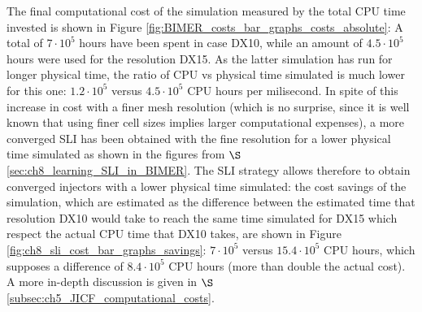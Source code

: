The final computational cost of the simulation measured by the total CPU time invested is shown in Figure \ref{fig:BIMER_costs_bar_graphs_costs_absolute}: A total of $7 \cdot 10^5$ hours have been spent in case DX10, while an amount of $4.5 \cdot 10^5$ hours were used for the resolution DX15. As the latter simulation has run for longer physical time, the ratio of CPU vs physical time simulated is much lower for this one: $1.2 \cdot 10^5$ versus $4.5 \cdot 10^5$ CPU hours per milisecond. In spite of this increase in cost with a finer mesh resolution (which is no surprise, since it is well known that using finer cell sizes implies larger computational expenses), a more converged SLI has been obtained with the fine resolution for a lower physical time simulated as shown in the figures from $\S$\ref{sec:ch8_learning_SLI_in_BIMER}. The SLI strategy allows therefore to obtain converged injectors with a lower physical time simulated: the cost savings of the simulation, which are estimated as the difference between the estimated time that resolution DX10 would take to reach the same time simulated for DX15 which respect the actual CPU time that DX10 takes, are shown in Figure \ref{fig:ch8_sli_cost_bar_graphs_savings}: $7 \cdot 10^5$ versus $15.4 \cdot 10^5$ CPU hours, which supposes a difference of $8.4 \cdot 10^5$ CPU hours (more than double the actual cost). A more in-depth discussion is given in $\S$\ref{subsec:ch5_JICF_computational_costs}. 


\clearpage

